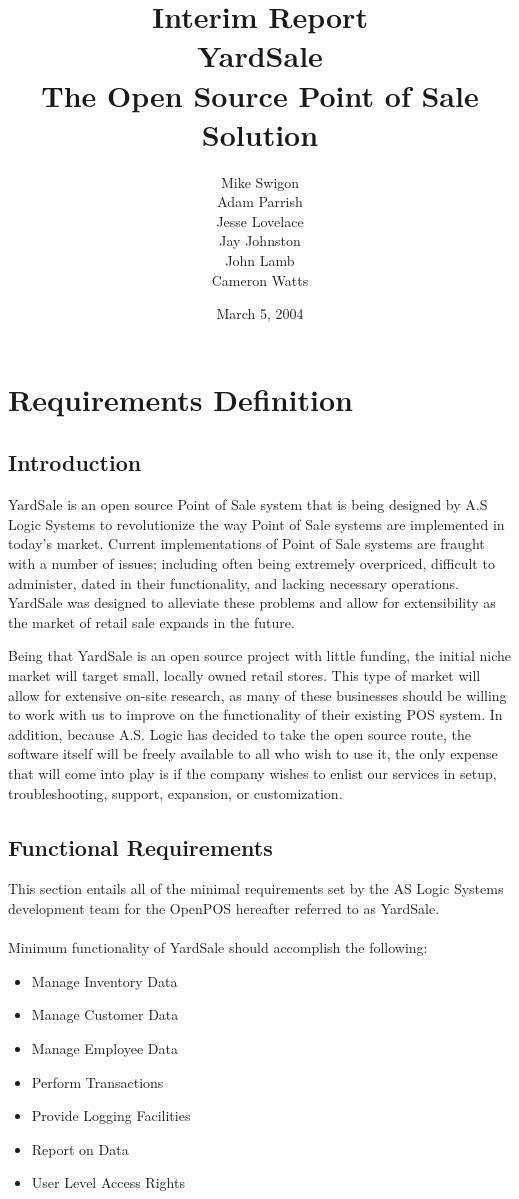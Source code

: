 \documentclass{report}
\title{{\LARGE {\bf Interim Report\\}}YardSale\\The Open Source Point of Sale Solution}
\author{Mike Swigon\\Adam Parrish\\Jesse Lovelace\\Jay Johnston\\John Lamb\\Cameron Watts}
\date{March 5, 2004}
\begin{document}
\maketitle

\tableofcontents

\chapter{Requirements Definition}

\section{Introduction}

YardSale is an open source Point of Sale system that is being
designed by A.S Logic Systems to revolutionize the way Point of
Sale systems are implemented in today's market.  Current
implementations of Point of Sale systems are fraught with a number
of issues; including often being extremely overpriced, difficult
to administer, dated in their functionality, and lacking necessary
operations.  YardSale was designed to alleviate these problems and
allow for extensibility as the market of retail sale expands in
the future.

Being that YardSale is an open source project with little funding,
the initial niche market will target small, locally owned retail
stores.  This type of market will allow for extensive on-site
research, as many of these businesses should be willing to work
with us to improve on the functionality of their existing POS
system.  In addition, because A.S. Logic has decided to take the
open source route, the software itself will be freely available to
all who wish to use it, the only expense that will come into play
is if the company wishes to enlist our services in setup,
troubleshooting, support, expansion, or customization.

\section{Functional Requirements}

This section entails all of the minimal requirements set by the AS
Logic Systems development team for the OpenPOS hereafter referred
to as YardSale.\\
\\Minimum functionality of YardSale should accomplish the
following:

\begin{itemize}
    \item {Manage Inventory Data}
    \item {Manage Customer Data}
    \item {Manage Employee Data}
    \item {Perform Transactions}
    \item {Provide Logging Facilities}
    \item {Report on Data}
    \item {User Level Access Rights}
\end{itemize}
\end{document}
